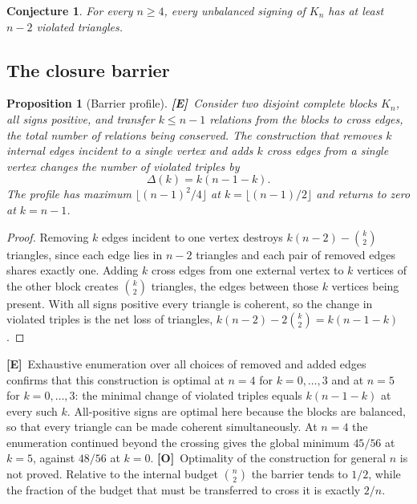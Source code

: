 \documentclass[11pt,a4paper]{article}
\theoremstyle{plain}
\newtheorem{proposition}[theorem]{Proposition}
\newtheorem{conjecture}[theorem]{Conjecture}
\theoremstyle{definition}
\theoremstyle{remark}
\newcommand{\statE}{\textbf{[E]}}
\newcommand{\statO}{\textbf{[O]}}
\begin{document}
\begin{conjecture}\label{conj:minfrust}
For every $n\ge4$, every unbalanced signing of $K_n$ has at least $n-2$ violated triangles.
\end{conjecture}

\subsection{The closure barrier}

\begin{proposition}[Barrier profile]\label{prop:barrier}
\statE\ Consider two disjoint complete blocks $K_n$, all signs positive, and transfer $k\le n-1$ relations from the blocks to cross edges, the total number of relations being conserved. The construction that removes $k$ internal edges incident to a single vertex and adds $k$ cross edges from a single vertex changes the number of violated triples by
\[
\Delta(k)=k(n-1-k).
\]
The profile has maximum $\lfloor(n-1)^2/4\rfloor$ at $k=\lfloor(n-1)/2\rfloor$ and returns to zero at $k=n-1$.
\end{proposition}

\begin{proof}
Removing $k$ edges incident to one vertex destroys $k(n-2)-\binom{k}{2}$ triangles, since each edge lies in $n-2$ triangles and each pair of removed edges shares exactly one. Adding $k$ cross edges from one external vertex to $k$ vertices of the other block creates $\binom{k}{2}$ triangles, the edges between those $k$ vertices being present. With all signs positive every triangle is coherent, so the change in violated triples is the net loss of triangles, $k(n-2)-2\binom{k}{2}=k(n-1-k)$.
\end{proof}

\statE\ Exhaustive enumeration over all choices of removed and added edges confirms that this construction is optimal at $n=4$ for $k=0,\dots,3$ and at $n=5$ for $k=0,\dots,3$: the minimal change of violated triples equals $k(n-1-k)$ at every such $k$. All-positive signs are optimal here because the blocks are balanced, so that every triangle can be made coherent simultaneously. At $n=4$ the enumeration continued beyond the crossing gives the global minimum $45/56$ at $k=5$, against $48/56$ at $k=0$. \statO\ Optimality of the construction for general $n$ is not proved. Relative to the internal budget $\binom{n}{2}$ the barrier tends to $1/2$, while the fraction of the budget that must be transferred to cross it is exactly $2/n$.
\end{document}
